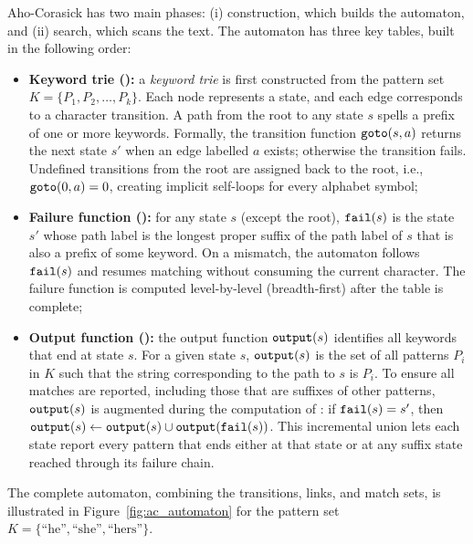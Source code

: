 
Aho-Corasick has two main phases: (i) construction, which builds the automaton, and (ii) search, which scans the text. The automaton has three key tables, built in the following order:

\begin{itemize}
    \item \textbf{Keyword trie ():} a \textit{keyword trie} is first constructed from the pattern set $K=\{ P_1, P_2, \dots, P_k \}$. Each node represents a state, and each edge corresponds to a character transition. A path from the root to any state $s$ spells a prefix of one or more keywords. Formally, the transition function $\mathtt{goto}(s, a)$ returns the next state $s'$ when an edge labelled $a$ exists; otherwise the transition fails. Undefined transitions from the root are assigned back to the root, i.e., $\mathtt{goto}(0, a) = 0$, creating implicit self-loops for every alphabet symbol;
    \item \textbf{Failure function ():} for any state $s$ (except the root), $\mathtt{fail}(s)$ is the state $s'$ whose path label is the longest proper suffix of the path label of $s$ that is also a prefix of some keyword. On a mismatch, the automaton follows $\mathtt{fail}(s)$ and resumes matching without consuming the current character. The failure function  is computed level-by-level (breadth-first) after the  table is complete;
    \item \textbf{Output function ():} the output function $\mathtt{output}(s)$ identifies all keywords that end at state $s$. For a given state $s$, $\mathtt{output}(s)$ is the set of all patterns $P_i$ in $K$ such that the string corresponding to the path to $s$ is $P_i$. To ensure all matches are reported, including those that are suffixes of other patterns, $\mathtt{output}(s)$ is augmented during the computation of : if $\mathtt{fail}(s) = s'$, then $\mathtt{output}(s) \leftarrow \mathtt{output}(s) \cup \mathtt{output}(\mathtt{fail}(s))$. This incremental union lets each state report every pattern that ends either at that state or at any suffix state reached through its failure chain.
\end{itemize}

The complete automaton, combining the  transitions,  links, and  match sets, is illustrated in Figure~\ref{fig:ac_automaton} for the pattern set $K=\{\text{``he''}, \text{``she''}, \text{``hers''}\}$.

